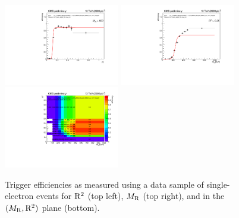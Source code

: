 \begin{figure}[ht!]
\centering
\includegraphics[width=0.45\textwidth]{figs/hlt13TeV/turnons_2015_no100GeVmuons/HLT_RsqMR240_Rsq0p09_MR200_HLT_RsqMR240_Rsq0p09_MR200_4jet_HLT_Rsq0p25_HLT_Ele27_eta2p1_WPLoose_Gsf_effRsq_MR500.pdf}
\includegraphics[width=0.45\textwidth]{figs/hlt13TeV/turnons_2015_no100GeVmuons/HLT_RsqMR240_Rsq0p09_MR200_HLT_RsqMR240_Rsq0p09_MR200_4jet_HLT_Rsq0p25_HLT_Ele27_eta2p1_WPLoose_Gsf_effMR_Rsq0p25.pdf}\\
\includegraphics[width=0.45\textwidth]{figs/hlt13TeV/turnons_2015_no100GeVmuons/HLT_RsqMR240_Rsq0p09_MR200_HLT_RsqMR240_Rsq0p09_MR200_4jet_HLT_Rsq0p25_HLT_Ele27_eta2p1_WPLoose_Gsf_eff2D.pdf}
\caption{\label{fig:turnons} Trigger efficiencies as measured using a
  data sample of single-electron events for $\mathrm{R}^2$ (top
  left), $M_\mathrm{R}$ (top right), and in the $(M_\mathrm{R},\mathrm{R}^2)$ plane (bottom).}
\end{figure}

